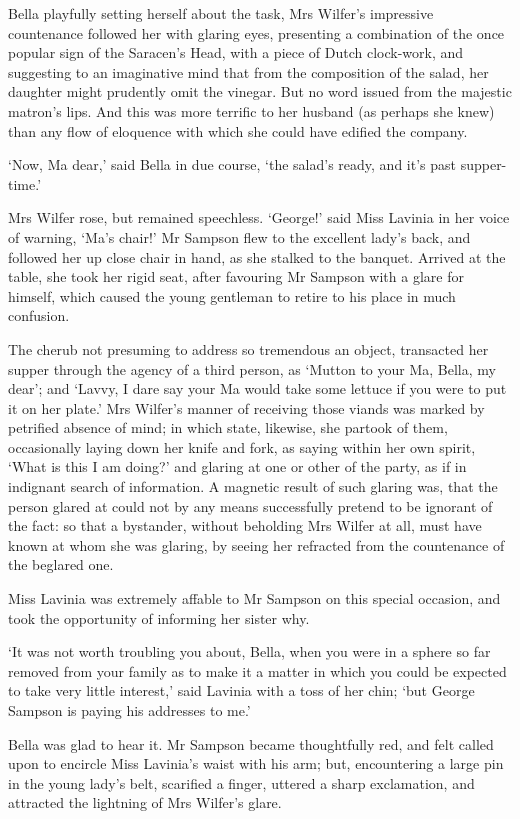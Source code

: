 Bella playfully setting herself about the task, Mrs Wilfer’s impressive
countenance followed her with glaring eyes, presenting a combination
of the once popular sign of the Saracen’s Head, with a piece of
Dutch clock-work, and suggesting to an imaginative mind that from the
composition of the salad, her daughter might prudently omit the vinegar.
But no word issued from the majestic matron’s lips. And this was more
terrific to her husband (as perhaps she knew) than any flow of eloquence
with which she could have edified the company.

‘Now, Ma dear,’ said Bella in due course, ‘the salad’s ready, and it’s
past supper-time.’

Mrs Wilfer rose, but remained speechless. ‘George!’ said Miss Lavinia
in her voice of warning, ‘Ma’s chair!’ Mr Sampson flew to the excellent
lady’s back, and followed her up close chair in hand, as she stalked
to the banquet. Arrived at the table, she took her rigid seat, after
favouring Mr Sampson with a glare for himself, which caused the young
gentleman to retire to his place in much confusion.

The cherub not presuming to address so tremendous an object, transacted
her supper through the agency of a third person, as ‘Mutton to your Ma,
Bella, my dear’; and ‘Lavvy, I dare say your Ma would take some lettuce
if you were to put it on her plate.’ Mrs Wilfer’s manner of receiving
those viands was marked by petrified absence of mind; in which state,
likewise, she partook of them, occasionally laying down her knife and
fork, as saying within her own spirit, ‘What is this I am doing?’ and
glaring at one or other of the party, as if in indignant search of
information. A magnetic result of such glaring was, that the person
glared at could not by any means successfully pretend to be ignorant of
the fact: so that a bystander, without beholding Mrs Wilfer at all, must
have known at whom she was glaring, by seeing her refracted from the
countenance of the beglared one.

Miss Lavinia was extremely affable to Mr Sampson on this special
occasion, and took the opportunity of informing her sister why.

‘It was not worth troubling you about, Bella, when you were in a sphere
so far removed from your family as to make it a matter in which you
could be expected to take very little interest,’ said Lavinia with a
toss of her chin; ‘but George Sampson is paying his addresses to me.’

Bella was glad to hear it. Mr Sampson became thoughtfully red, and
felt called upon to encircle Miss Lavinia’s waist with his arm; but,
encountering a large pin in the young lady’s belt, scarified a finger,
uttered a sharp exclamation, and attracted the lightning of Mrs Wilfer’s
glare.

